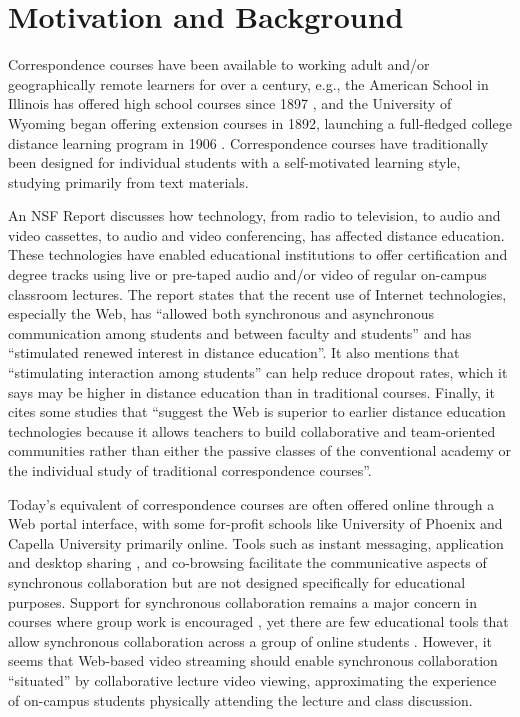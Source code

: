 \documentclass{sig-alternate}
\begin{document}
\section{Motivation and Background} \label{background}

Correspondence courses have been available to working adult and/or
geographically remote learners for over a century, e.g., the American
School in Illinois has offered high school courses since 1897
\cite{AmericanSchool}, and the University of Wyoming began offering
extension courses in 1892, launching a full-fledged college distance
learning program in 1906 \cite{UWyoming}.  Correspondence courses have
traditionally been designed for individual students with a
self-motivated learning style, studying primarily from text materials.

An NSF Report \cite{NSFReport} discusses how technology, from radio to
television, to audio and video cassettes, to audio and video
conferencing, has affected distance education. These technologies have
enabled educational institutions to offer certification and degree
tracks using live or pre-taped audio and/or video of regular on-campus
classroom lectures.  The report states that the recent use of Internet
technologies, especially the Web, has ``allowed both synchronous and
asynchronous communication among students and between faculty and
students'' and has ``stimulated renewed interest in distance
education''. It also mentions that ``stimulating interaction among
students'' can help reduce dropout rates, which it says may be higher
in distance education than in traditional courses. Finally, it cites
some studies that ``suggest the Web is superior to earlier distance
education technologies because it allows teachers to build
collaborative and team-oriented communities rather than either the
passive classes of the conventional academy or the individual study of
traditional correspondence courses''.

Today's equivalent of correspondence courses are often offered online
through a Web portal interface, with some for-profit schools like
University of Phoenix \cite{UPhoenix} and Capella University
\cite{Capella} primarily online.  Tools such as instant messaging,
application and desktop sharing \cite{VNC, WebEx}, and co-browsing
\cite{CAPPS, LIEBERMAN, SIDLER} facilitate the communicative aspects
of synchronous collaboration but are not designed specifically for
educational purposes.  Support for synchronous collaboration remains a
major concern in courses where group work is encouraged \cite{WELLS},
yet there are few educational tools that allow synchronous
collaboration across a group of online students \cite{BURGESS}.
However, it seems that Web-based video streaming should enable
synchronous collaboration ``situated'' by collaborative lecture video
viewing, approximating the experience of on-campus students physically
attending the lecture and class discussion.
\end{document}

